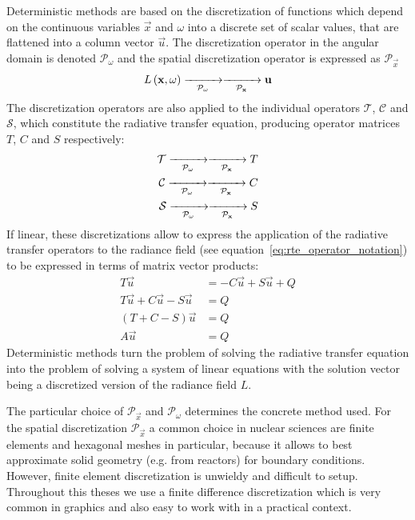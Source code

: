 Deterministic methods are based on the discretization of functions which depend on the continuous variables $\vec{x}$ and $\omega$ into a discrete set of scalar values, that are flattened into a column vector $\vec{u}$. The discretization operator in the angular domain is denoted $\mathcal{P}_\omega$ and the spatial discretization operator is expressed as $\mathcal{P}_{\vec{x}}$
\begin{align*}
L\left(\vec{x}, \omega\right)
\xrightarrow[\mathcal{P}_\omega]{\makebox[1cm]{}}
\xrightarrow[\mathcal{P}_{\vec{x}}]{\makebox[1cm]{}}
\vec{u}
\end{align*}
The discretization operators are also applied to the individual operators $\mathcal{T}$, $\mathcal{C}$ and $\mathcal{S}$, which constitute the radiative transfer equation, producing operator matrices $T$, $C$ and $S$ respectively:
\begin{align*}
\mathcal{T}
\xrightarrow[\mathcal{P}_\omega]{\makebox[1cm]{}}
\xrightarrow[\mathcal{P}_{\vec{x}}]{\makebox[1cm]{}}
T
\\
\mathcal{C}
\xrightarrow[\mathcal{P}_\omega]{\makebox[1cm]{}}
\xrightarrow[\mathcal{P}_{\vec{x}}]{\makebox[1cm]{}}
C
\\
\mathcal{S}
\xrightarrow[\mathcal{P}_\omega]{\makebox[1cm]{}}
\xrightarrow[\mathcal{P}_{\vec{x}}]{\makebox[1cm]{}}
S
\end{align*}
If linear, these discretizations allow to express the application of the radiative transfer operators to the radiance field (see equation~\ref{eq:rte_operator_notation}) to be expressed in terms of matrix vector products:
\begin{align*}
T\vec{u}&=-C\vec{u}+S\vec{u}+Q
\\
T\vec{u}+C\vec{u}-S\vec{u}&=Q
\\
(T+C-S)\vec{u}&=Q
\\
A\vec{u}&=Q
\end{align*}
Deterministic methods turn the problem of solving the radiative transfer equation into the problem of solving a system of linear equations with the solution vector being a discretized version of the radiance field $L$.

The particular choice of $\mathcal{P}_{\vec{x}}$ and $\mathcal{P}_\omega$ determines the concrete method used. For the spatial discretization $\mathcal{P}_{\vec{x}}$ a common choice in nuclear sciences are finite elements and hexagonal meshes in particular, because it allows to best approximate solid geometry (e.g. from reactors) for boundary conditions. However, finite element discretization is unwieldy and difficult to setup. Throughout this theses we use a finite difference discretization which is very common in graphics and also easy to work with in a practical context.

